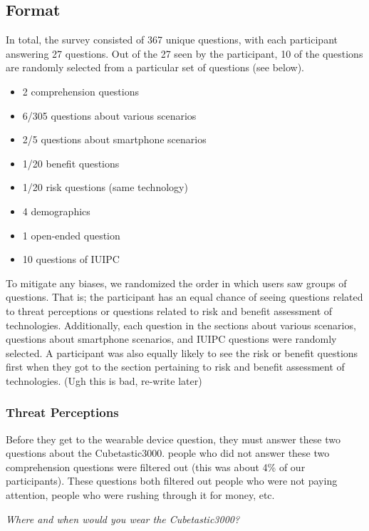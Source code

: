 \documentclass{acm_proc_article-sp}
\begin{document}
\subsection{Format}
In total, the survey consisted of 367 unique questions, with each participant answering 27 questions. Out of the 27 seen by the participant, 10 of the questions are randomly selected from a particular set of questions (see below).   \\[-.8cm]

\begin{itemize} \itemsep1pt \parskip0pt 
\item 2 comprehension questions 
\item 6/305 questions about various scenarios 
\item 2/5 questions about smartphone scenarios 
\item 1/20 benefit questions 
\item 1/20 risk questions (same technology) 
\item 4 demographics
\item 1 open-ended question 
\item 10 questions of IUIPC \\[-.8cm]
\end{itemize}

To mitigate any biases, we randomized the order in which users saw groups of questions. That is; the participant has an equal chance of seeing questions related to threat perceptions or questions related to risk and benefit assessment of technologies. Additionally, each question in the sections about various scenarios, questions about smartphone scenarios, and IUIPC questions were randomly selected. A participant was also equally likely to see the risk or benefit questions first when they got to the section pertaining to risk and benefit assessment of technologies. (Ugh this is bad, re-write later)

\subsubsection{Threat Perceptions}
Before they get to the wearable device question, they must answer these two questions about the Cubetastic3000. people who did not answer these two comprehension questions were filtered out (this was about 4\% of our participants). These questions both filtered out people who were not paying attention, people who were rushing through it for money, etc. 

\textit{Where and when would you wear the Cubetastic3000?}\\[-.5cm]
\end{document}
